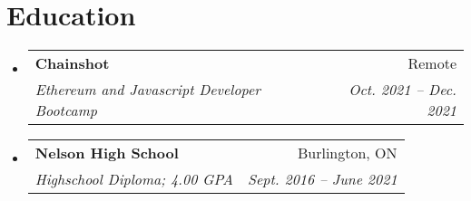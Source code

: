 \documentclass[letterpaper,11pt]{article}
\makeatletter
\newcommand{\resumeSubheading}[4]{
  \vspace{-2pt}\item
    \begin{tabular*}{0.97\textwidth}[t]{l@{\extracolsep{\fill}}r}
      \textbf{#1} & #2 \\
      \textit{\small#3} & \textit{\small #4} \\
    \end{tabular*}\vspace{-7pt}
}
\newcommand{\resumeSubHeadingListStart}{\begin{itemize}[leftmargin=0.15in, label={}]}
\newcommand{\resumeSubHeadingListEnd}{\end{itemize}}
\makeatother
\begin{document}
\section{Education}
\resumeSubHeadingListStart
  \resumeSubheading
    {Chainshot}{Remote}
    {Ethereum and Javascript Developer Bootcamp}{Oct. 2021 -- Dec. 2021}
  \resumeSubheading
    {Nelson High School}{Burlington, ON}
    {Highschool Diploma; 4.00 GPA}{Sept. 2016 -- June 2021}
\resumeSubHeadingListEnd

\end{document}
